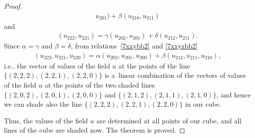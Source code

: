 \documentclass[11pt]{article}
\begin{document}
\begin{proof}
\begin{gather}
u_{2 0 1}) + \beta (u_{2 1 0}, u_{2 1 1}) \label{7xxybb2}
\end{gather} and
\begin{gather}
(u_{2 2 2}, u_{2 2 1}) = \gamma (u_{2 0 2}, u_{2 0 1}) + \delta
(u_{2 1 2}, u_{2 1 1}). \label{7xxyzbb2}
\end{gather} Since $\alpha = \gamma$
and $\beta = \delta$, from relations~\eqref{7xxybb2} and
\eqref{7xxyzbb2}
\begin{gather*} (u_{2 2 2}, u_{2 2 1}, u_{2 2 0}) = \alpha
(u_{2 0 2}, u_{2 0 1}, u_{2 0 0}) + \beta (u_{2 1 2}, u_{2 1 1},
u_{2 1 0}), %
\end{gather*} i.e., the vector of values of the
f\/ield $u$ at the points of the line $\{(2, 2, 2), (2, 2, 1), (2, 2,
0)\}$ is a~linear combination of the vectors of values of the f\/ield
$u$ at the points of the two shaded lines $\{(2, 0, 2), (2, 0, 1),
(2, 0, 0)\}$ and $\{(2, 1, 2), (2, 1, 1), (2, 1, 0)\}$, and hence we
can shade also the line $\{(2, 2, 2), (2, 2, 1), (2, 2, 0)\}$ in our
cube.


Thus, the values of the f\/ield $u$ are determined at all points of
our cube, and all lines of the cube are shaded now. The theorem is
proved.
\end{proof}
\end{document}
